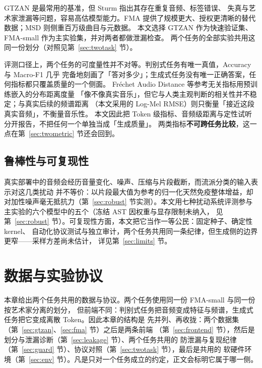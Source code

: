 \documentclass[UTF8,10pt,a4paper]{ctexart}
\begin{document}
GTZAN\cite{tzanetakis2002gtzan} 是最常用的基准，但 Sturm 指出其存在重复音频、标签错误、
失真与艺术家泄漏等问题，容易高估模型能力\cite{sturm2013gtzan}。FMA\cite{defferrard2017fma}
提供了规模更大、授权更清晰的替代数据；MSD\cite{bertin2011msd} 则侧重百万级曲目与元数据。
本文选择 GTZAN 作为快速验证集、FMA-small 作为主实验集，并对两者都做泄漏检查。
两个任务的全部实验共用这同一份划分（对照见第~\ref{sec:twotask} 节）。

评测口径上，两个任务的可度量性并不对等。判别式任务有唯一真值，Accuracy 与 Macro-F1 几乎
完备地刻画了「答对多少」；生成式任务没有唯一正确答案，任何指标都只覆盖质量的一个侧面。
Fréchet Audio Distance\cite{kilgour2019fad} 等参考无关指标用预训练嵌入的分布距离度量
「像不像真实音乐」，但它与人类主观判断的相关性并不稳定；与真实后续的频谱距离
（本文采用的 Log-Mel RMSE）则只衡量「接近这段真实音频」，不衡量音乐性。
本文因此把 Token 级指标、音频级距离与定性试听分开报告，不把任何一个单独当成「生成质量」。
两类指标\textbf{不可跨任务比较}，这一点在第~\ref{sec:twometric} 节还会回到。

\subsection{鲁棒性与可复现性}\label{sec:rw-robust}

真实部署中的音频会经历音量变化、噪声、压缩与片段截断，而流派分类的输入表示对这几类扰动
并不等价：以片段最大值为参考的归一化天然免疫整体增益，却对加性噪声毫无抵抗力（第~\ref{sec:robust}
节实测）。本文用七种扰动系统评测参与主实验的六个模型中的五个（冻结 AST 因权重与显存限制未纳入，
见第~\ref{sec:robust} 节）。可复现性方面，本文把它当作一等公民：固定种子、确定性 kernel、
自动化协议测试与独立审计，两个任务共用同一条纪律，但生成侧的边界更窄——采样方差尚未估计，
详见第~\ref{sec:limits} 节。

\section{数据与实验协议}\label{sec:data}

本章给出两个任务共用的数据与协议。两个任务使用同一份 FMA-small 与同一份按艺术家分离的划分，
但前端不同：判别式任务把音频变成特征与频谱，生成式任务把它变成离散 Token。因此本章的结构是
先并列、再收拢：两个数据集（第~\ref{sec:gtzan}、\ref{sec:fma} 节）之后是两条前端
（第~\ref{sec:frontend} 节），然后是划分与泄漏诊断（第~\ref{sec:leakage} 节）、两个任务共用的
防泄漏与复现纪律（第~\ref{sec:guard} 节）、协议对照（第~\ref{sec:twotask} 节），最后是共用的
软硬件环境（第~\ref{sec:env} 节）。凡是只对一个任务成立的约定，正文会标明它属于哪一侧。
\end{document}
